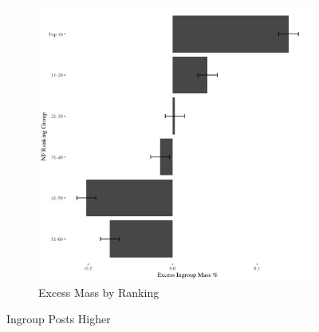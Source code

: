 \documentclass[12pt,letterpaper]{article}
\begin{document}
\begin{figure}[ht]
\begin{subfigure}{.5\textwidth}
        \includegraphics[width=.9\linewidth]{Output/Graphs/Audit/Excess Mass/US NF excess mass by ranking group.jpg}  
        \caption{Excess Mass by Ranking}
        \label{fig:sub-second}
    \end{subfigure}
\caption{Ingroup Posts Higher}
\end{figure}


\end{document}
